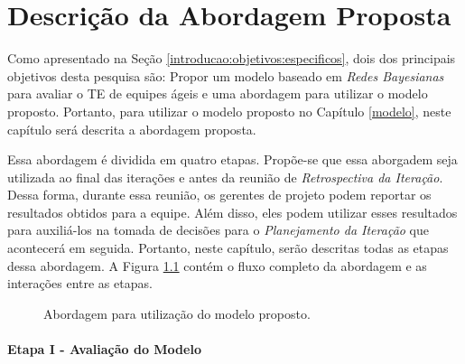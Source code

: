 \chapter{Descrição da Abordagem Proposta}
\label{descricao}

Como apresentado na Seção \ref{introducao:objetivos:especificos}, dois dos principais objetivos desta pesquisa são: Propor um modelo baseado em \textit{Redes Bayesianas} para avaliar o TE de equipes ágeis e uma abordagem para utilizar o modelo proposto. Portanto, para utilizar o modelo proposto no Capítulo \ref{modelo}, neste capítulo será descrita a abordagem proposta.

Essa abordagem é dividida em quatro etapas. Propõe-se que essa aborgadem seja utilizada ao final das iterações e antes da reunião de \textit{Retrospectiva da Iteração}. Dessa forma, durante essa reunião, os gerentes de projeto podem reportar os resultados obtidos para a equipe. Além disso, eles podem utilizar esses resultados para auxiliá-los na tomada de decisões para o \textit{Planejamento da Iteração} que acontecerá em seguida. Portanto, neste capítulo, serão descritas todas as etapas dessa abordagem. A Figura \ref{descricao:etapas} contém o fluxo completo da abordagem e as interações entre as etapas.

\begin{figure}[ht!]
\begin{center}
	\end{center}
	\caption{Abordagem para utilização do modelo proposto.}
	\label{descricao:etapas}
\end{figure}

\subsubsection{Etapa I - Avaliação do Modelo}
\label{descricao:avaliacao}


